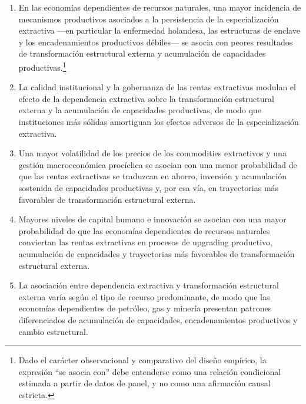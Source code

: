 \documentclass[../../PTFM.tex]{subfiles}
\begin{document}
	\begin{enumerate}



		\item En las economías dependientes de recursos naturales, una mayor incidencia de mecanismos productivos asociados a la persistencia de la especialización extractiva ---en particular la enfermedad holandesa, las estructuras de enclave y los encadenamientos productivos débiles--- se asocia con peores resultados de transformación estructural externa y acumulación de capacidades productivas.\footnote{Dado el carácter observacional y comparativo del diseño empírico, la expresión ``se asocia con'' debe entenderse como una relación condicional estimada a partir de datos de panel, y no como una afirmación causal estricta.}



		\item La calidad institucional y la gobernanza de las rentas extractivas modulan el efecto de la dependencia extractiva sobre la transformación estructural externa y la acumulación de capacidades productivas, de modo que instituciones más sólidas amortiguan los efectos adversos de la especialización extractiva.



		\item Una mayor volatilidad de los precios de los commodities extractivos y una gestión macroeconómica procíclica se asocian con una menor probabilidad de que las rentas extractivas se traduzcan en ahorro, inversión y acumulación sostenida de capacidades productivas y, por esa vía, en trayectorias más favorables de transformación estructural externa.



		\item Mayores niveles de capital humano e innovación se asocian con una mayor probabilidad de que las economías dependientes de recursos naturales conviertan las rentas extractivas en procesos de upgrading productivo, acumulación de capacidades y trayectorias más favorables de transformación estructural externa.



		\item La asociación entre dependencia extractiva y transformación estructural externa varía según el tipo de recurso predominante, de modo que las economías dependientes de petróleo, gas y minería presentan patrones diferenciados de acumulación de capacidades, encadenamientos productivos y cambio estructural.



	\end{enumerate}

\end{document}
